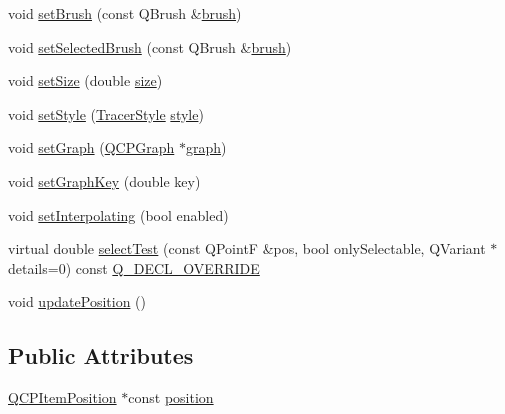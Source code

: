 \begin{DoxyCompactItemize}
void \hyperlink{class_q_c_p_item_tracer_a2c303f7470a30084daa201ed556b3c36}{set\+Brush} (const Q\+Brush \&\hyperlink{class_q_c_p_item_tracer_a6dd4660e70f58bb00390bcda56be568d}{brush})
\item 
void \hyperlink{class_q_c_p_item_tracer_a0f55c084980a7a312af859d3e7b558ef}{set\+Selected\+Brush} (const Q\+Brush \&\hyperlink{class_q_c_p_item_tracer_a6dd4660e70f58bb00390bcda56be568d}{brush})
\item 
void \hyperlink{class_q_c_p_item_tracer_ae47fe0617f5fef5fdb766999569be10a}{set\+Size} (double \hyperlink{class_q_c_p_item_tracer_a4e42d7b49f293273a74a49a2457856e2}{size})
\item 
void \hyperlink{class_q_c_p_item_tracer_a41a2ac4f1acd7897b4e2a2579c03204e}{set\+Style} (\hyperlink{class_q_c_p_item_tracer_a2f05ddb13978036f902ca3ab47076500}{Tracer\+Style} \hyperlink{class_q_c_p_item_tracer_afdaee32c9ccc9c14502b28d3d86bf5ed}{style})
\item 
void \hyperlink{class_q_c_p_item_tracer_af5886f4ded8dd68cb4f3388f390790c0}{set\+Graph} (\hyperlink{class_q_c_p_graph}{Q\+C\+P\+Graph} $\ast$\hyperlink{class_q_c_p_item_tracer_ac6526e3e1fff79894f034823461b138a}{graph})
\item 
void \hyperlink{class_q_c_p_item_tracer_a6840143b42f3b685cedf7c6d83a704c8}{set\+Graph\+Key} (double key)
\item 
void \hyperlink{class_q_c_p_item_tracer_a6c244a9d1175bef12b50afafd4f5fcd2}{set\+Interpolating} (bool enabled)
\item 
virtual double \hyperlink{class_q_c_p_item_tracer_a9fd955fea40e977d66f3a9fd5765aec4}{select\+Test} (const Q\+PointF \&pos, bool only\+Selectable, Q\+Variant $\ast$details=0) const \hyperlink{qcustomplot_8h_a42cc5eaeb25b85f8b52d2a4b94c56f55}{Q\+\_\+\+D\+E\+C\+L\+\_\+\+O\+V\+E\+R\+R\+I\+DE}
\item 
void \hyperlink{class_q_c_p_item_tracer_a5b90296109e36384aedbc8908a670413}{update\+Position} ()
\end{DoxyCompactItemize}
\subsection*{Public Attributes}
\begin{DoxyCompactItemize}
\item 
\hyperlink{class_q_c_p_item_position}{Q\+C\+P\+Item\+Position} $\ast$const \hyperlink{class_q_c_p_item_tracer_a69917e2fdb2b3a929c196958feee7cbe}{position}
\end{DoxyCompactItemize}
